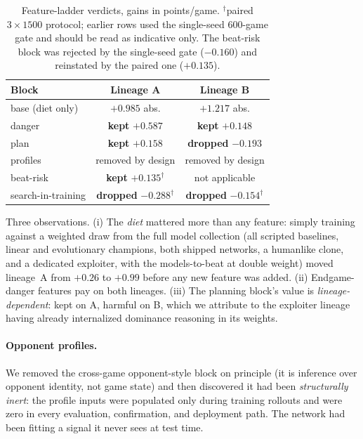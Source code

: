 \documentclass[11pt]{article}
\begin{document}
\begin{table}[h]
\centering
\begin{tabular}{lcc}
\toprule
Block & Lineage A & Lineage B \\
\midrule
base (diet only) & $+0.985$ abs. & $+1.217$ abs. \\
danger & \textbf{kept} $+0.587$ & \textbf{kept} $+0.148$ \\
plan & \textbf{kept} $+0.158$ & \textbf{dropped} $-0.193$ \\
profiles & removed by design & removed by design \\
beat-risk & \textbf{kept} $+0.135^{\dagger}$ & not applicable \\
search-in-training & \textbf{dropped} $-0.288^{\dagger}$ & \textbf{dropped} $-0.154^{\dagger}$ \\
\bottomrule
\end{tabular}
\caption{Feature-ladder verdicts, gains in points/game.
$^{\dagger}$paired $3\times1500$ protocol; earlier rows used the
single-seed 600-game gate and should be read as indicative only. The
beat-risk block was rejected by the single-seed gate ($-0.160$) and
reinstated by the paired one ($+0.135$).}
\label{tab:ladder}
\end{table}

Three observations. (i) The \emph{diet} mattered more than any feature:
simply training against a weighted draw from the full model collection
(all scripted baselines, linear and evolutionary champions, both
shipped networks, a humanlike clone, and a dedicated exploiter, with
the models-to-beat at double weight) moved lineage~A from $+0.26$ to
$+0.99$ before any new feature was added. (ii) Endgame-danger features
pay on both lineages. (iii) The planning block's value is
\emph{lineage-dependent}: kept on A, harmful on B, which we attribute
to the exploiter lineage having already internalized dominance
reasoning in its weights.

\paragraph{Opponent profiles.} We removed the cross-game opponent-style
block on principle (it is inference over opponent identity, not game
state) and then discovered it had been \emph{structurally inert}: the
profile inputs were populated only during training rollouts and were
zero in every evaluation, confirmation, and deployment path. The
network had been fitting a signal it never sees at test time.
\end{document}

